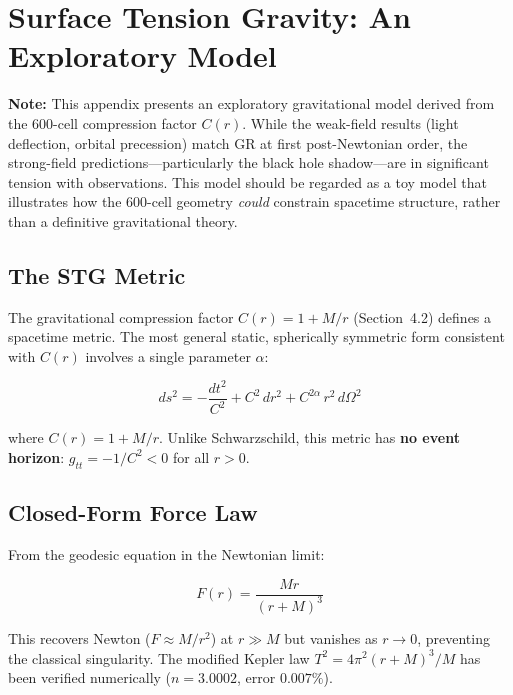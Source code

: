 \documentclass[12pt,a4paper]{article}
\begin{document}
\appendix

\section{Surface Tension Gravity: An Exploratory Model}
\label{app:stg}

\textbf{Note:} This appendix presents an exploratory gravitational model derived from the 600-cell compression factor $C(r)$. While the weak-field results (light deflection, orbital precession) match GR at first post-Newtonian order, the strong-field predictions---particularly the black hole shadow---are in significant tension with observations. This model should be regarded as a toy model that illustrates how the 600-cell geometry \emph{could} constrain spacetime structure, rather than a definitive gravitational theory.

\subsection{The STG Metric}

The gravitational compression factor $C(r) = 1 + M/r$ (Section~4.2) defines a spacetime metric. The most general static, spherically symmetric form consistent with $C(r)$ involves a single parameter $\alpha$:

\begin{equation}
ds^2 = -\frac{dt^2}{C^2} + C^2\,dr^2 + C^{2\alpha}\,r^2\,d\Omega^2
\label{eq:stg_metric}
\end{equation}

where $C(r) = 1 + M/r$. Unlike Schwarzschild, this metric has \textbf{no event horizon}: $g_{tt} = -1/C^2 < 0$ for all $r > 0$.

\subsection{Closed-Form Force Law}

From the geodesic equation in the Newtonian limit:

\begin{equation}
F(r) = \frac{Mr}{(r + M)^3}
\end{equation}

This recovers Newton ($F \approx M/r^2$) at $r \gg M$ but vanishes as $r \to 0$, preventing the classical singularity. The modified Kepler law $T^2 = 4\pi^2(r + M)^3/M$ has been verified numerically ($n = 3.0002$, error $0.007\%$).
\end{document}
